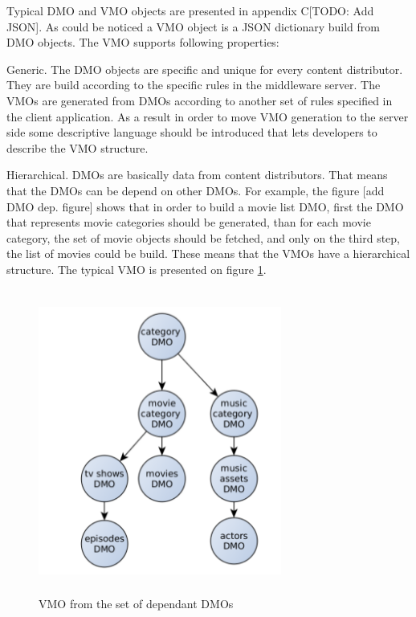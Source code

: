 
Typical DMO and VMO objects are presented in appendix C[TODO: Add JSON]. As could be noticed a VMO object is a JSON dictionary build from DMO objects. The VMO supports following properties:

Generic. The DMO objects are specific and unique for every content distributor. They are build according to the specific rules in the middleware server. The VMOs are generated from DMOs according to another set of rules specified in the client application. As a result in order to move VMO generation to the server side some descriptive language should be introduced that lets developers to describe the VMO structure.

Hierarchical. DMOs are basically data from content distributors. That means that the DMOs can be depend on other DMOs. For example, the figure [add DMO dep. figure] shows that in order to build a movie list DMO, first the DMO that represents movie categories should be generated, than for each movie category, the set of movie objects should be fetched, and only on the third step, the list of movies could be build. These means that the VMOs have a hierarchical structure. The typical VMO is presented on figure \ref{fig:vmo_example}.

\begin{figure}[h]
    \centering
	\includegraphics[width=8cm,height=10cm,keepaspectratio]{images/vmo_example.png}
    \caption{VMO from the set of dependant DMOs}
    \label{fig:vmo_example}
\end{figure} 

